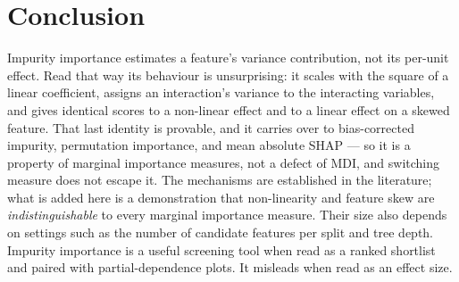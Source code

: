 \section{Conclusion}

Impurity importance estimates a feature's variance contribution, not its
per-unit
effect. Read that way its behaviour is unsurprising: it scales with the square
of
a linear coefficient, assigns an interaction's variance to the interacting
variables, and gives identical scores to a non-linear effect and to a linear
effect on a skewed feature. That last identity is provable, and it carries over
to bias-corrected impurity, permutation importance, and mean absolute SHAP ---
so it is a property of marginal importance measures, not a defect of MDI, and
switching measure does not escape it. The mechanisms are
established in the literature; what is added here is a demonstration that
non-linearity and feature skew are \emph{indistinguishable} to every marginal
importance measure. Their size also depends on settings such as the number of
candidate features per split and tree depth. Impurity importance is a useful screening tool when read as a
ranked shortlist and paired with partial-dependence plots. It misleads when read
as an effect size.
